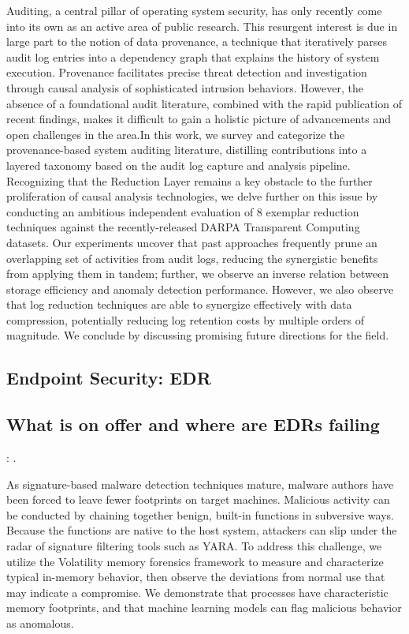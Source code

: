 \documentclass{article}
\begin{document}
Auditing, a central pillar of operating system security, has only recently come into its own as an active area of public research. This resurgent interest is due in large part to the notion of data provenance, a technique that iteratively parses audit log entries into a dependency graph that explains the history of system execution. Provenance facilitates precise threat detection and investigation through causal analysis of sophisticated intrusion behaviors. However, the absence of a foundational audit literature, combined with the rapid publication of recent findings, makes it difficult to gain a holistic picture of advancements and open challenges in the area.In this work, we survey and categorize the provenance-based system auditing literature, distilling contributions into a layered taxonomy based on the audit log capture and analysis pipeline. Recognizing that the Reduction Layer remains a key obstacle to the further proliferation of causal analysis technologies, we delve further on this issue by conducting an ambitious independent evaluation of 8 exemplar reduction techniques against the recently-released DARPA Transparent Computing datasets. Our experiments uncover that past approaches frequently prune an overlapping set of activities from audit logs, reducing the synergistic benefits from applying them in tandem; further, we observe an inverse relation between storage efficiency and anomaly detection performance. However, we also observe that log reduction techniques are able to synergize effectively with data compression, potentially reducing log retention costs by multiple orders of magnitude. We conclude by discussing promising future directions for the field.


\subsection{Endpoint Security: EDR}

\textbf{} \textcite{Hayes:2023}

\subsection{What is on offer and where are EDRs failing}

\textbf{}: \textcite{Lyles:2022}.

As signature-based malware detection techniques mature, malware authors have been forced to leave fewer footprints on target machines. Malicious activity can be conducted by chaining together benign, built-in functions in subversive ways. Because the functions are native to the host system, attackers can slip under the radar of signature filtering tools such as YARA. To address this challenge, we utilize the Volatility memory forensics framework to measure and characterize typical in-memory behavior, then observe the deviations from normal use that may indicate a compromise. We demonstrate that processes have characteristic memory footprints, and that machine learning models can flag malicious behavior as anomalous.
\end{document}
